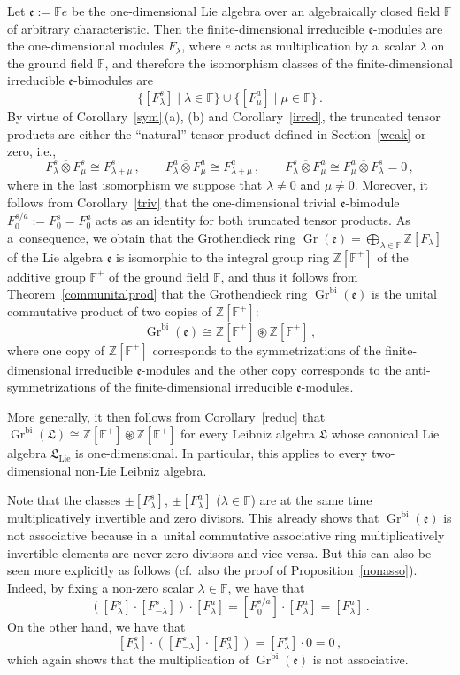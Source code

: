 \documentclass{jonasart}
\DeclareMathOperator{\bi}{bi}
\DeclareMathOperator{\K}{Gr}
\DeclareMathOperator{\lie}{Lie}
\newcommand{\ef}{\mathfrak{e}}
\newcommand{\fbb}{\mathbb{F}}
\newcommand{\lf}{\mathfrak{L}}
\newcommand{\ovo}{\overline{\otimes}}
\newcommand{\zbb}{\mathbb{Z}}
\begin{document}
	\begin{example}\label{1dim}
		{Let $\ef:=\fbb e$ be the one-dimensional Lie algebra over an algebraically closed field $\fbb$ of arbitrary characteristic. Then the finite-dimensional irreducible $\ef$-modules are the one-dimensional modules $F_\lambda$, where $e$ acts as multiplication by a~scalar
		$\lambda$ on the ground field $\fbb$, and therefore the isomorphism classes of the finite-dimensional irreducible $\ef$-bimodules are}
		\[
			\{[F_\lambda^s ]\mid\lambda\in\fbb\}\cup\{[F_\mu^a ]\mid\mu\in\fbb\}\,.
		\]
		{By virtue of Corollary~\ref{sym}\,(a), (b) and Corollary~\ref{irred}, the truncated tensor products are either the ``natural'' tensor product defined in Section~\ref{weak} or zero, i.e.,}
		\[
			F_\lambda^s\ovo F_\mu^s\cong F_{\lambda+\mu}^s\,,\quad\quad
			F_\lambda^a\ovo F_\mu^a\cong F_{\lambda+\mu}^a\,,\quad\quad
			F_\lambda^s\ovo F_\mu^a\cong F_\mu^a\ovo F_\lambda^s =0\,,
		\]
		{where in the last isomorphism we suppose that $\lambda\not=0$
		and $\mu\not=0$. Moreover, it follows from Corollary~\ref{triv} that the one-dimensional trivial $\ef$-bimodule $F_0^{s/a}:=F_0^s =F_0^a$ acts as an identity for both truncated tensor products. As a~consequence, we obtain that the Grothendieck ring $\K(\ef)=\bigoplus_{\lambda\in
		\fbb}\zbb[F_\lambda]$ of the Lie algebra $\ef$ is isomorphic to the integral group ring $\zbb[\fbb^+ ]$ of the additive group $\fbb^+$ of the ground field $\fbb$, and thus it follows from Theorem~\ref{communitalprod} that the Grothendieck ring $\K^{\bi}(\ef)$ is the unital commutative product of two copies of $\zbb[\fbb^+ ]$:}
		\[
			\K^{\bi}(\ef)\cong\zbb[\fbb^+ ]\circledast\zbb[\fbb^+ ]\,,
		\]
		{where one copy of $\zbb[\fbb^+ ]$ corresponds to the symmetrizations of the finite-dimen\-sional irreducible $\ef$-modules and the other copy corresponds to the anti-symme\-trizations of the finite-dimensional irreducible
		$\ef$-modules.}

		{More generally, it then follows from Corollary~\ref{reduc} that $\K^{\bi}
		(\lf)\cong\zbb[\fbb^+ ]\circledast\zbb[\fbb^+ ]$ for every Leibniz algebra
		$\lf$ whose canonical Lie algebra $\lf_{\lie}$ is one-dimensional. In particular, this applies to every two-dimensional non-Lie Leibniz algebra.}

		{Note that the classes $\pm[F_\lambda^s ]$, $\pm[F_\lambda^a ]$
		($\lambda\in\fbb$) are at the same time multiplicatively invertible and zero divisors. This already shows that $\K^{\bi}(\ef)$ is not associative because in a~unital commutative associative ring multiplicatively invertible elements are never zero divisors and vice versa. But this can also be seen more explicitly as follows (cf.\ also the proof of Proposition~\ref{nonasso}). Indeed, by fixing a non-zero scalar $\lambda\in\fbb$, we have that}
		\[
			([F_\lambda^s ]\cdot[F_{-\lambda}^s ])\cdot[F_\lambda^a ]=
			[F_0^{s/a}]\cdot[F_\lambda^a ]=[F_\lambda^a ]\,.
		\]
		{On the other hand, we have that}
		\[
			[F_\lambda^s ]
			\cdot([F_{-\lambda}^s ]\cdot[F_\lambda^a ])=
			[F_\lambda^s ]\cdot0= 0\,,
		\]
		{which again shows that the multiplication of $\K^{\bi}(\ef)$ is not associative.}


\end{example}
\end{document}
